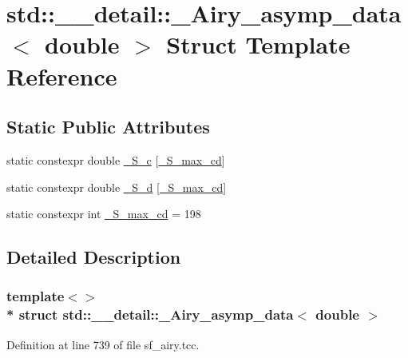 \hypertarget{structstd_1_1____detail_1_1__Airy__asymp__data_3_01double_01_4}{}\section{std\+:\+:\+\_\+\+\_\+detail\+:\+:\+\_\+\+Airy\+\_\+asymp\+\_\+data$<$ double $>$ Struct Template Reference}
\label{structstd_1_1____detail_1_1__Airy__asymp__data_3_01double_01_4}
\subsection*{Static Public Attributes}
\begin{DoxyCompactItemize}
\item 
static constexpr double \hyperlink{structstd_1_1____detail_1_1__Airy__asymp__data_3_01double_01_4_a38e855b175c89166c4220cacd07ca1c7}{\+\_\+\+S\+\_\+c} \mbox{[}\hyperlink{structstd_1_1____detail_1_1__Airy__asymp__data_3_01double_01_4_a38e485184d2762e83a27937efc343d01}{\+\_\+\+S\+\_\+max\+\_\+cd}\mbox{]}
\item 
static constexpr double \hyperlink{structstd_1_1____detail_1_1__Airy__asymp__data_3_01double_01_4_aeaf6aab79b67a46932e9d16864ad0f78}{\+\_\+\+S\+\_\+d} \mbox{[}\hyperlink{structstd_1_1____detail_1_1__Airy__asymp__data_3_01double_01_4_a38e485184d2762e83a27937efc343d01}{\+\_\+\+S\+\_\+max\+\_\+cd}\mbox{]}
\item 
static constexpr int \hyperlink{structstd_1_1____detail_1_1__Airy__asymp__data_3_01double_01_4_a38e485184d2762e83a27937efc343d01}{\+\_\+\+S\+\_\+max\+\_\+cd} = 198
\end{DoxyCompactItemize}


\subsection{Detailed Description}
\subsubsection*{template$<$$>$\\*
struct std\+::\+\_\+\+\_\+detail\+::\+\_\+\+Airy\+\_\+asymp\+\_\+data$<$ double $>$}



Definition at line 739 of file sf\+\_\+airy.\+tcc.



